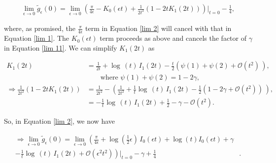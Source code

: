 \documentclass{article}
\numberwithin{equation}{section} %
\begin{document}
\begin{equation}
\begin{split}
\lim_{\epsilon \rightarrow 0}\tilde{g}_\epsilon(0) = \lim_{\epsilon \rightarrow 0} \left( \frac{\pi}{4\epsilon} - K_0(\epsilon t) + \frac{1}{2t^2}(1-2tK_1(2t)) \right)\bigg\vert_{t=0} - \frac{1}{4},
\end{split}
\label{lim 2}
\end{equation}

\noindent where, as promised, the $\frac{\pi}{4\epsilon}$ term in Equation \ref{lim 2} will cancel with that in Equation \ref{lim 1}. The $K_0(\epsilon t)$ term proceeds as above and cancels the factor of $\gamma$ in Equation \ref{lim 11}. We can simplify $K_1(2t)$ as

\begin{equation}
\begin{split}
K_1(2t) &= \frac{1}{2t} + \log\,(t) \,I_1(2t)  - \frac{t}{2}\left(\psi(1) + \psi(2) + \mathcal{O}(t^2)\, \right),\\
& \quad \quad \mathrm{where \,} \,\psi(1) + \psi(2) = 1-2\gamma,\\
\Rightarrow \frac{1}{2t^2} ( 1 - 2t K_1(2t)) &= \frac{1}{2t^2} - \left( \frac{1}{2t^2} + \frac{1}{t} \log\,(t) \,I_1(2t)  - \frac{1}{2}(1-2\gamma + \mathcal{O}(t^2))\,\right),\\
&= -\frac{1}{t} \log\,(t) \,I_1(2t)  + \frac{1}{2} - \gamma - \mathcal{O}(t^2).
\end{split}
\end{equation}

So, in Equation \ref{lim 2}, we now have

\begin{equation}
\begin{split}
\Rightarrow \lim_{\epsilon \rightarrow 0}\tilde{g}_\epsilon(0) = \lim_{\epsilon \rightarrow 0} \left( \frac{\pi}{4\epsilon} + \log(\frac{1}{2}\epsilon)\, I_0(\epsilon t) + \log(t)I_0(\epsilon t) + \gamma \right.&\\
\left. - \frac{1}{t} \log\,(t) \,I_1(2t) + \mathcal{O}(\epsilon^2t^2) \right)\bigg\vert_{t=0} -\gamma + \frac{1}{4}&.
\end{split}
\label{lim 21}
\end{equation}
\end{document}

